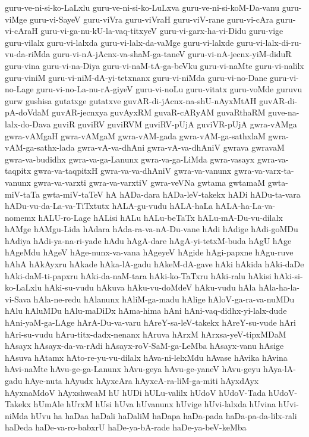 {guru-ve-ni-si-ko-LaLxlu
guru-ve-ni-si-ko-LuLxva
guru-ve-ni-si-koM-Da-vanu
guru-viMge
guru-vi-SayeV
guru-viVra
guru-viVraH
guru-viV-rane
guru-vi-cAra
guru-vi-cAraH
guru-vi-ga-nu-kU-la-vaq-titxyeV
guru-vi-garx-ha-vi-Didu
guru-vige
guru-vilalx
guru-vi-lalxda
guru-vi-lalx-da-vaMge
guru-vi-lalxde
guru-vi-lalx-di-ru-vu-da-riMda
guru-vi-nA-jAcnx-va-shaM-ga-taneV
guru-vi-nA-jecnx-yiM-diduR
guru-vina
guru-vi-na-Diya
guru-vi-naM-tA-ga-beVku
guru-vi-naMte
guru-vi-nalilx
guru-viniM
guru-vi-niM-dA-yi-tetxnanx
guru-vi-niMda
guru-vi-no-Dane
guru-vi-no-Lage
guru-vi-no-La-nu-rA-giyeV
guru-vi-noLu
guru-vitatx
guru-voMde
guruvu
gurw
gushisa
gutatxge
gutatxve
guvAR-di-jAcnx-na-shU-nAyxMtAH
guvAR-di-pA-doVdaM
guvAR-jecnxya
guvAyxRM
guvaR-cARyAM
guvaRthaRM
guve-na-lalx-do-Dava
guviR
guviRV
guviRVM
guviRV-pUjA
guviVR-pUjA
gwra-vAMga
gwra-vAMgaH
gwra-vAMgaM
gwra-vAM-gada
gwra-vAM-ga-sathxlaM
gwra-vAM-ga-sathx-lada
gwra-vA-va-dhAni
gwra-vA-va-dhAniV
gwrava
gwravaM
gwra-va-budidhx
gwra-va-ga-Lanunx
gwra-va-ga-LiMda
gwra-vasayx
gwra-va-taqpitx
gwra-va-taqpitxH
gwra-va-va-dhAniV
gwra-va-vanunx
gwra-va-varx-ta-vanunx
gwra-va-varxti
gwra-va-varxtiV
gwra-veVNa
gwtama
gwtamaM
gwta-miV-taTa
gwta-miV-taTeV
hA
hADa-dara
hADa-leV-takekx
hADi
hADu-ta-vara
hADu-vu-da-La-va-TiTxtutx
hALA-gu-vudu
hALA-haLa
hALA-ha-La-va-nomemx
hALU-ro-Lage
hALisi
hALu
hALu-beTaTx
hALu-mA-Du-vu-dilalx
hAMge
hAMgu-Lida
hAdara
hAda-ra-va-nA-Du-vane
hAdi
hAdige
hAdi-goMDu
hAdiya
hAdi-ya-na-ri-yade
hAdu
hAgA-dare
hAgA-yi-tetxM-buda
hAgU
hAge
hAgeMdu
hAgeV
hAge-nunx-va-vana
hAgeyeV
hAgide
hAgi-papxne
hAgu-ruve
hAhA
hAkAyxru
hAkade
hAka-lA-gadu
hAkeM-dA-gave
hAki
hAkida
hAki-daDe
hAki-daM-ti-papxru
hAki-da-naM-tara
hAki-ko-TaTxru
hAki-ralu
hAkisi
hAki-si-ko-LaLxlu
hAki-su-vudu
hAkuva
hAku-vu-doMdeV
hAku-vudu
hAla
hAla-ha-la-vi-Sava
hAla-ne-redu
hAlanunx
hAliM-ga-madu
hAlige
hAloV-ga-ra-va-nuMDu
hAlu
hAluMDu
hAlu-maDiDx
hAma-hima
hAni
hAni-vaq-didhx-yi-lalx-dude
hAni-yaM-ga-LAge
hArA-Du-va-varu
hAreY-sa-leV-takekx
hAreY-su-vude
hAri
hAri-su-vudu
hAru-titx-dadx-nenanx
hAruva
hArxM
hArxsa-yeV-tipxMDaM
hAsayx
hAsayx-da-va-rAdi
hAsayx-roV-SaM-ga-LeMba
hAsayx-vanu
hAsige
hAsuva
hAtamx
hAto-re-yu-vu-dilalx
hAva-ni-lelxMdu
hAvase
hAvika
hAvina
hAvi-naMte
hAvu-ge-ga-Lanunx
hAvu-geya
hAvu-ge-yaneV
hAvu-geyu
hAya-lA-gadu
hAye-nuta
hAyudx
hAyxcAra
hAyxcA-ra-liM-ga-miti
hAyxdAyx
hAyxnaMdoV
hAyxshwcaM
hU
hUDi
hULu-valilx
hUdoV
hUdoV-Tada
hUdoV-Takekx
hUmAle
hUrxM
hUsi
hUva
hUvanunx
hUvige
hUvi-lalxda
hUvina
hUvi-niMda
hUvu
ha
haDaa
haDali
haDaliM
haDapa
haDa-pada
haDa-pa-da-lilx-rali
haDeda
haDe-va-ro-babxrU
haDe-ya-bA-rade
haDe-ya-beV-keMba
}
